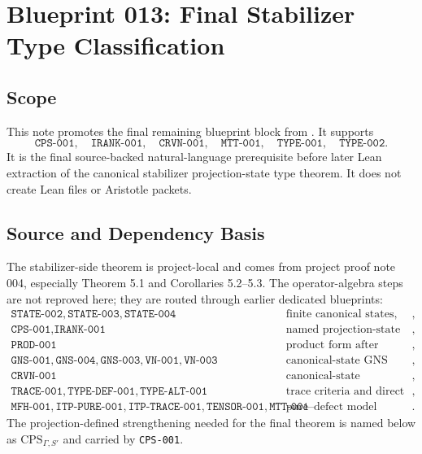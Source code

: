 \documentclass{article}
\begin{document}
\section*{Blueprint 013: Final Stabilizer Type Classification}

\subsection*{Scope}

This note promotes the final remaining blueprint block from
.  It supports
\[
  \texttt{CPS-001},\quad
  \texttt{IRANK-001},\quad
  \texttt{CRVN-001},\quad
  \texttt{MTT-001},\quad
  \texttt{TYPE-001},\quad
  \texttt{TYPE-002}.
\]
It is the final source-backed natural-language prerequisite before later Lean
extraction of the canonical stabilizer projection-state type theorem.  It does
not create Lean files or Aristotle packets.

\subsection*{Source and Dependency Basis}

The stabilizer-side theorem is project-local and comes from project proof note
004, especially Theorem 5.1 and Corollaries 5.2--5.3.  The operator-algebra
steps are not reproved here; they are routed through earlier dedicated
blueprints:
\[
\begin{array}{ll}
\texttt{STATE-002},\texttt{STATE-003},\texttt{STATE-004}
  & \text{finite canonical states, quasi-local state, and restriction},\\
\texttt{CPS-001},\texttt{IRANK-001}
  & \text{named projection-state input and internal rank package},\\
\texttt{PROD-001} & \text{product form after adapted symplectic reduction},\\
\texttt{GNS-001},\texttt{GNS-004},\texttt{GNS-003},\texttt{VN-001},\texttt{VN-003}
  & \text{canonical-state GNS data and represented-region transport},\\
\texttt{CRVN-001}
  & \text{canonical-state represented region von Neumann algebra},\\
\texttt{TRACE-001},\texttt{TYPE-DEF-001},\texttt{TYPE-ALT-001}
  & \text{trace criteria and direct factor type predicates},\\
\texttt{MFH-001},\texttt{ITP-PURE-001},\texttt{ITP-TRACE-001},\texttt{TENSOR-001},
\texttt{MTT-001}
  & \text{pure--defect model factors and tensor type table}.
\end{array}
\]
The projection-defined strengthening needed for the final theorem is named
below as \(\mathrm{CPS}_{\Gamma,S'}\) and carried by \texttt{CPS-001}.
\end{document}
